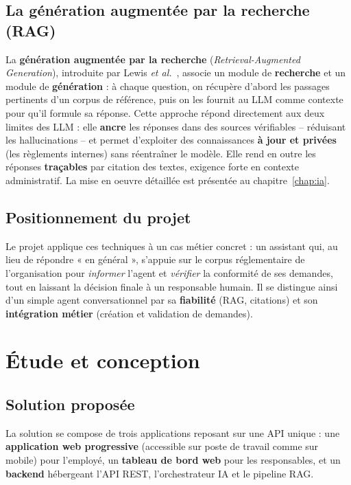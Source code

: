 \documentclass[a4paper,12pt,oneside]{report}
\begin{document}
\section{La génération augmentée par la recherche (RAG)}
La \textbf{génération augmentée par la recherche} (\emph{Retrieval-Augmented
Generation}), introduite par Lewis \emph{et al.}~\cite{rag}, associe un module de
\textbf{recherche} et un module de \textbf{génération} : à chaque question, on
récupère d'abord les passages pertinents d'un corpus de référence, puis on les
fournit au LLM comme contexte pour qu'il formule sa réponse. Cette approche
répond directement aux deux limites des LLM : elle \textbf{ancre} les réponses
dans des sources vérifiables -- réduisant les hallucinations -- et permet
d'exploiter des connaissances \textbf{à jour et privées} (les règlements
internes) sans réentraîner le modèle. Elle rend en outre les réponses
\textbf{traçables} par citation des textes, exigence forte en contexte
administratif. La mise en oeuvre détaillée est présentée au
chapitre~\ref{chap:ia}.

\section{Positionnement du projet}
Le projet applique ces techniques à un cas métier concret : un assistant qui,
au lieu de répondre « en général », s'appuie sur le corpus réglementaire de
l'organisation pour \emph{informer} l'agent et \emph{vérifier} la conformité de
ses demandes, tout en laissant la décision finale à un responsable humain. Il se
distingue ainsi d'un simple agent conversationnel par sa \textbf{fiabilité} (RAG,
citations) et son \textbf{intégration métier} (création et validation de
demandes).

\chapter{Étude et conception}

\section{Solution proposée}
La solution se compose de trois applications reposant sur une API unique : une
\textbf{application web progressive} (accessible sur poste de travail comme sur
mobile) pour l'employé, un \textbf{tableau de bord web} pour les responsables, et
un \textbf{backend} hébergeant l'API REST, l'orchestrateur IA et le pipeline RAG.
\end{document}
